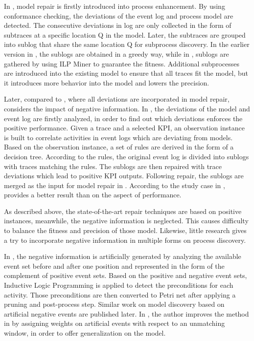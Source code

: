 In  \cite{fahland2012repairing}, model repair is firstly introduced into process enhancement. By using conformance checking, the deviations of the event log and process model are detected. The consecutive deviations in log  are only collected in the form of subtraces at a specific location Q in the model. Later, the subtraces are grouped into sublog that share the same location Q for subprocess discovery. In the earlier version in  \cite{fahland2012repairing}, the sublogs are obtained in a greedy way, while in  \cite{fahland2015model}, sublogs are gathered by using ILP Miner to guarantee the fitness. Additional subprocesses are introduced into the existing model to ensure that all traces fit the model, but it introduces more behavior into the model and lowers the precision.

Later, compared to  \cite{fahland2012repairing, fahland2015model}, where all deviations are incorporated in model repair,  \cite{dees2017enhancing} considers the impact of negative information.  In  \cite{dees2017enhancing}, the deviations of the model and event log are firstly analyzed, in order to find out which deviations enforces the positive performance. Given a trace and a selected KPI, an observation instance is built to correlate  activities in event logs which are deviating from models. Based on the observation instance,  a set of rules are derived in the form of a decision tree. According to the rules, the original event log is divided into sublogs with traces matching the rules. The sublogs are then repaired with trace deviations which lead to positive KPI outputs. Following repair, the sublogs are merged as the input for model repair in  \cite{fahland2015model}. According to the study case in  \cite{dees2017enhancing}, \cite{dees2017enhancing} provides a better result than  \cite{fahland2015model} on the aspect of performance. 
 
As described above, the state-of-the-art repair techniques are based on positive instances, meanwhile, the negative information is neglected. This causes difficulty to balance the fitness and precision of those model. Likewise, little research gives a try to incorporate negative information in multiple forms on process discovery.

In  \cite{goedertier2009robust}, the negative information is artificially generated by analyzing the available event set before and after one position and represented in the form of the complement of positive event sets. Based on the positive and negative event sets, Inductive Logic Programming is applied to detect the preconditions for each activity. Those preconditions are then converted to Petri net after applying a pruning and post-process step. Similar work on model discovery based on artificial negative events are published later. In  \cite{vanden2014determining}, the author improves the method in  \cite{goedertier2009robust} by assigning weights on artificial events with respect to an unmatching window, in order to offer generalization on the model. 


